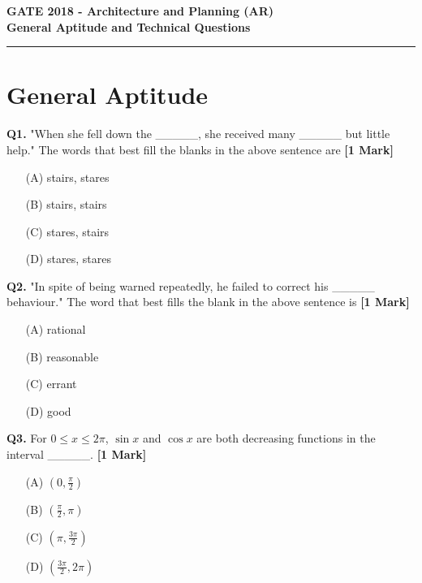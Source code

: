 \documentclass[11pt]{article}
\newcommand{\questiona}[2]{
    \noindent\textbf{Q#2.} #1 \hfill \textbf{[1 Mark]}
}
\begin{document}
\begin{center}
    \Large\textbf{GATE 2018 - Architecture and Planning (AR)} \\
    \large\textbf{General Aptitude and Technical Questions} \\
    \rule{\textwidth}{0.5pt} %
\end{center}

\vspace{0.5cm}

\section*{General Aptitude}

\questiona{"When she fell down the \_\_\_\_\_, she received many \_\_\_\_\_ but little help." The words that best fill the blanks in the above sentence are}{1}
\begin{enumerate}
    \item[(A)] stairs, stares  
    \item[(B)] stairs, stairs  
    \item[(C)] stares, stairs  
    \item[(D)] stares, stares  
\end{enumerate}
\vspace{0.5cm}

\questiona{"In spite of being warned repeatedly, he failed to correct his \_\_\_\_\_ behaviour." The word that best fills the blank in the above sentence is}{2}
\begin{enumerate}
    \item[(A)] rational  
    \item[(B)] reasonable  
    \item[(C)] errant  
    \item[(D)] good  
\end{enumerate}
\vspace{0.5cm}

\questiona{For \(0 \leq x \leq 2\pi\), \(\sin x\) and \(\cos x\) are both decreasing functions in the interval \_\_\_\_\_.}{3}
\begin{enumerate}
    \item[(A)] \(\left(0, \frac{\pi}{2}\right)\)  
    \item[(B)] \(\left(\frac{\pi}{2}, \pi\right)\)  
    \item[(C)] \(\left(\pi, \frac{3\pi}{2}\right)\)  
    \item[(D)] \(\left(\frac{3\pi}{2}, 2\pi\right)\)  
\end{enumerate}
\vspace{0.5cm}
\end{document}
